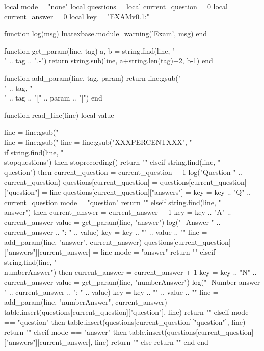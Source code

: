 \usepackage{fancyhdr}
\usepackage{amssymb}
\usepackage{luacode}
\usepackage{pgffor}
\usepackage{enumitem}
\usepackage{qrcode}
\usepackage{hyperref}
\usepackage{graphicx}
\usepackage{emptypage}

\usepackage[a4paper, margin={0.6in, 1in}]{geometry}


\begin{luacode*}

local mode = "none"
local questions = {}
local current_question = 0
local current_answer = 0
local key = "EXAMv0.1:"


function log(msg)
	luatexbase.module_warning('Exam', msg)
end


function get_param(line, tag)
	a, b = string.find(line, "\\" .. tag .. "{.-}")
	return string.sub(line, a+string.len(tag)+2, b-1)
end


function add_param(line, tag, param)
	return line:gsub("\\" .. tag, "\\" .. tag .. "[" .. param .. "]")
end


function read_line(line)
    local value
    
    line = line:gsub("\\%
    line = line:gsub("%
    line = line:gsub("XXXPERCENTXXX", "\\%

    if string.find(line, "\\stopquestions") then
        stoprecording()
        return ""
    elseif string.find(line, "\\question") then
        current_question = current_question + 1
        log("Question " .. current_question)
        questions[current_question] = {}
        questions[current_question]["question"] = {line}
        questions[current_question]["answers"] = {}
        key = key .. "Q" .. current_question
        mode = "question"
        return ""
    elseif string.find(line, "\\answer") then
        current_answer = current_answer + 1
        key = key .. "A" .. current_answer
        value = get_param(line, "answer")
        log("- Answer " .. current_answer .. ": " .. value)
        key = key .. "{" .. value .. "}"
        line = add_param(line, "answer", current_answer)
        questions[current_question]["answers"][current_answer] = {line}
        mode = "answer"
        return ""
    elseif string.find(line, "\\numberAnswer") then
        current_answer = current_answer + 1
        key = key .. "N" .. current_answer
        value = get_param(line, "numberAnswer")
        log("- Number answer " .. current_answer .. ": " .. value)
        key = key .. "{" .. value .. "}"
        line = add_param(line, "numberAnswer", current_answer)
        table.insert(questions[current_question]["question"], line)
        return ""
    elseif mode == "question" then
        table.insert(questions[current_question]["question"], line)
        return ""
    elseif mode == "answer" then
        table.insert(questions[current_question]["answers"][current_answer], line)
        return ""
    else
        return ""
    end
end



\end{luacode*}
